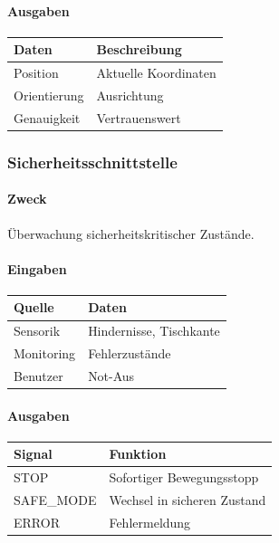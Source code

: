 \paragraph{Ausgaben}\label{ausgaben-2}

\begin{longtable}[]{@{}ll@{}}
\toprule\noalign{}
Daten & Beschreibung \\
\midrule\noalign{}
\endhead
\bottomrule\noalign{}
\endlastfoot
Position & Aktuelle Koordinaten \\
Orientierung & Ausrichtung \\
Genauigkeit & Vertrauenswert \\
\end{longtable}

\subsubsection{Sicherheitsschnittstelle}\label{sicherheitsschnittstelle}

\paragraph{Zweck}\label{zweck-9}

Überwachung sicherheitskritischer Zustände.

\paragraph{Eingaben}\label{eingaben-3}

\begin{longtable}[]{@{}ll@{}}
\toprule\noalign{}
Quelle & Daten \\
\midrule\noalign{}
\endhead
\bottomrule\noalign{}
\endlastfoot
Sensorik & Hindernisse, Tischkante \\
Monitoring & Fehlerzustände \\
Benutzer & Not-Aus \\
\end{longtable}

\paragraph{Ausgaben}\label{ausgaben-3}

\begin{longtable}[]{@{}ll@{}}
\toprule\noalign{}
Signal & Funktion \\
\midrule\noalign{}
\endhead
\bottomrule\noalign{}
\endlastfoot
STOP & Sofortiger Bewegungsstopp \\
SAFE\_MODE & Wechsel in sicheren Zustand \\
ERROR & Fehlermeldung \\
\end{longtable}

